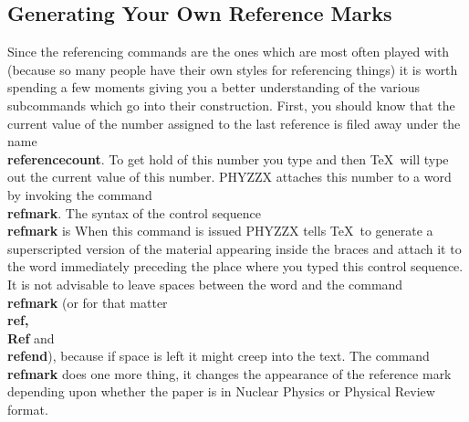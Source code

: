 \subsection{Generating Your Own Reference Marks}
 
Since the referencing commands are the ones which are
most often played with (because
so many people have their own styles for referencing things) it
is worth spending a few moments giving you a better understanding
of the various subcommands which go into their construction.
First, you should know that the current value of the number
assigned to the last reference
is filed away under the name
{\bf \\referencecount}.
To get hold of this number you type
and then \TeX\ will type out the current value of this number.
PHYZZX attaches this number to a word by invoking
the command {\bf \\refmark}.
The syntax of the control sequence {\bf \\refmark} is
When this command is issued PHYZZX tells \TeX\ to generate a
superscripted version of the material appearing inside the braces
and attach it to the word immediately preceding the place where you
typed this control sequence.
It is not advisable to leave spaces between the word
and the command {\bf \\refmark} (or for that matter {\bf \\ref, \\Ref}
and {\bf \\refend}),
because if space is left it might creep into the text.
The command {\bf \\refmark} does one more thing, it changes the
appearance of the reference mark depending upon whether the paper
is in Nuclear Physics or Physical Review format.
 
